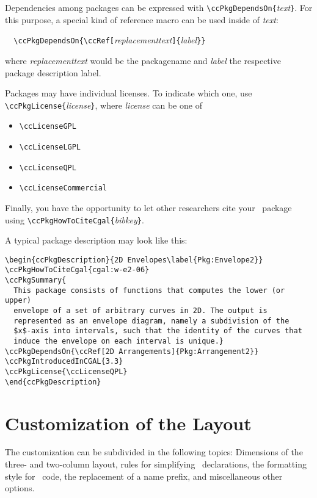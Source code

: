 \documentclass[11pt]{article}
\begin{document}
Dependencies among packages can be expressed with
\verb+\ccPkgDependsOn{+{\em text}\verb+}+. For this purpose, a special
kind of reference macro can be used inside of {\em text}:

\verb+  \ccPkgDependsOn{\ccRef[+{\em replacementtext}\verb+]{+{\em label}\verb+}}+

where {\em replacementtext} would be the packagename and {\em label} the
respective package description label.

Packages may have individual licenses. To indicate which one, use
\verb+\ccPkgLicense{+{\em license}\verb+}+, where {\em license} can be one of

\begin{itemize}
 \item \verb+\ccLicenseGPL+
 \item \verb+\ccLicenseLGPL+
 \item \verb+\ccLicenseQPL+
 \item \verb+\ccLicenseCommercial+
\end{itemize}

Finally, you have the opportunity to let other researchers cite your \cgal\ package using
\verb+\ccPkgHowToCiteCgal{+{\em bibkey}\verb+}+.

A typical package description may look like this:

\begin{verbatim}
\begin{ccPkgDescription}{2D Envelopes\label{Pkg:Envelope2}}
\ccPkgHowToCiteCgal{cgal:w-e2-06}
\ccPkgSummary{
  This package consists of functions that computes the lower (or upper)
  envelope of a set of arbitrary curves in 2D. The output is
  represented as an envelope diagram, namely a subdivision of the
  $x$-axis into intervals, such that the identity of the curves that
  induce the envelope on each interval is unique.}
\ccPkgDependsOn{\ccRef[2D Arrangements]{Pkg:Arrangement2}}
\ccPkgIntroducedInCGAL{3.3}
\ccPkgLicense{\ccLicenseQPL}
\end{ccPkgDescription}
\end{verbatim}


\section{Customization of the Layout}
\label{sectionCustomize}


The customization can be subdivided in the following topics:
Dimensions of the three- and two-column layout, rules for simplifying
\CC\ declarations, the formatting style for \CC\ code, the replacement
of a name prefix, and miscellaneous other options.
\end{document}
